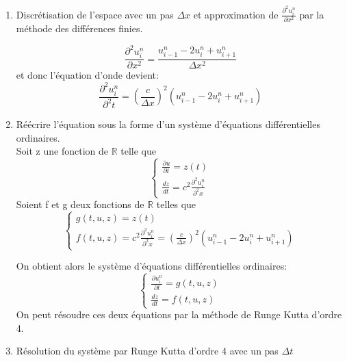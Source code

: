 \begin{enumerate}
    \item Discrétisation de l'espace avec un pas $\Delta x$ et approximation de $\frac{\partial^2u^n_{i}}{\partial x^2}$ par la méthode des différences finies.
    
    \begin{equation*}
        \frac{\partial^2u^n_{i}}{\partial x^2}=\frac{u^n_{i-1} - 2u^n_{i} + u^n_{i+1}}{\Delta x^2} 
    \end{equation*}
    et donc l'équation d'onde devient:
    \begin{equation*}
        \frac{\partial^2u^n_{i}}{\partial^2t}=(\frac{c}{\Delta x})^2(u^n_{i-1} - 2u^n_{i} + u^n_{i+1})
    \end{equation*}
    
    \item Réécrire l'équation sous la forme d'un système d'équations différentielles ordinaires.\\
    
    Soit z une fonction de $\mathbb{R}$ telle que\\
    \[
      \begin{cases}
        \frac{\partial u}{\partial t}=z(t) \\
        \frac{dz}{dt}= c^2 \frac{\partial^2u^n_{i}}{\partial^2 x}
      \end{cases}
    \]
    \newline
    Soient f et g deux fonctions de $\mathbb{R}$ telles que 
      \[
      \begin{cases}
        g(t,u,z)=z(t) \\
        f(t,u,z)=c^2 \frac{\partial^2u^n_{i}}{\partial^2 x}=(\frac{c}{\Delta x})^2(u^n_{i-1} - 2u^n_{i} + u^n_{i+1})
      \end{cases}
    \]
    
    On obtient alors le système d'équations différentielles ordinaires:
      \[
      \begin{cases}
        \frac{\partial u^n_{i}}{\partial t}=g(t,u,z) \\
        \frac{dz}{dt}=f(t,u,z)
      \end{cases}
    \]
    On peut résoudre ces deux équations par la méthode de Runge Kutta d'ordre 4.\\
    
    \item Résolution du système par Runge Kutta d'ordre 4 avec un pas $\Delta t$\\
    

\end{enumerate}
